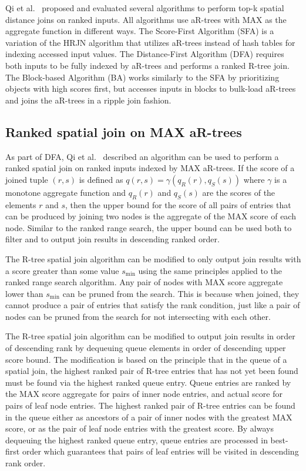 Qi et al.~\cite{qi2013efficient} proposed and evaluated several algorithms to perform top-k spatial distance joins on ranked inputs. All algorithms use aR-trees with MAX as the aggregate function in different ways. The Score-First Algorithm (SFA) is a variation of the HRJN algorithm that utilizes aR-trees instead of hash tables for indexing accessed input values. The Distance-First Algorithm (DFA) requires both inputs to be fully indexed by aR-trees and performs a ranked R-tree join. The Block-based Algorithm (BA) works similarly to the SFA by prioritizing objects with high scores first, but accesses inputs in blocks to bulk-load aR-trees and joins the aR-trees in a ripple join fashion.

\subsection{Ranked spatial join on MAX aR-trees}

As part of DFA, Qi et al.~\cite{qi2013efficient} described an algorithm can be used to perform a ranked spatial join on ranked inputs indexed by MAX aR-trees. If the score of a joined tuple \((r, s)\) is defined as \(q(r, s) = \gamma(q_R(r), q_S(s))\) where \(\gamma\) is a monotone aggregate function and \(q_R(r)\) and \(q_S(s)\) are the scores of the elements \(r\) and \(s\), then the upper bound for the score of all pairs of entries that can be produced by joining two nodes is the aggregate of the MAX score of each node. Similar to the ranked range search, the upper bound can be used both to filter and to output join results in descending ranked order.

The R-tree spatial join algorithm can be modified to only output join results with a score greater than some value \(s_{\min}\) using the same principles applied to the ranked range search algorithm. Any pair of nodes with MAX score aggregate lower than \(s_{\min}\) can be pruned from the search. This is because when joined, they cannot produce a pair of entries that satisfy the rank condition, just like a pair of nodes can be pruned from the search for not intersecting with each other.

The R-tree spatial join algorithm can be modified to output join results in order of descending rank by dequeuing queue elements in order of descending upper score bound. The modification is based on the principle that in the queue of a spatial join, the highest ranked pair of R-tree entries that has not yet been found must be found via the highest ranked queue entry. Queue entries are ranked by the MAX score aggregate for pairs of inner node entries, and actual score for pairs of leaf node entries. The highest ranked pair of R-tree entries can be found in the queue either as ancestors of a pair of inner nodes with the greatest MAX score, or as the pair of leaf node entries with the greatest score. By always dequeuing the highest ranked queue entry, queue entries are processed in best-first order which guarantees that pairs of leaf entries will be visited in descending rank order.

